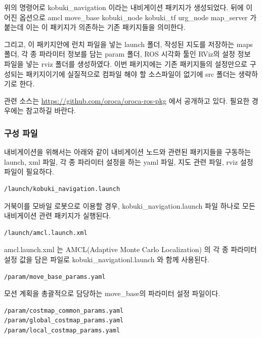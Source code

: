 위의 명령어로 kobuki\_navigation 이라는 내비게이션 패키지가 생성되었다. 뒤에 이어진 옵션으로 amcl move\_base kobuki\_node kobuki\_tf urg\_node map\_server 가 붙는데 이는 이 패키지가 의존하는 기존 패키지들을 의미한다. 

그리고, 이 패키지안에 런치 파일을 넣는 launch 폴더, 작성된 지도를 저장하는 maps폴더, 각 종 파라미터 정보를 담는 param 폴더, ROS 시각화 툴인 RViz의 설정 정보 파일을 넣는 rviz 폴더를 생성하였다. 이번 패키지에는 기존 패키지들의 설정만으로 구성되는 패키지이기에 실질적으로 컴파일 해야 할 소스파일이 없기에 src 폴더는 생략하기로 한다.

관련 소스는 \url{https://github.com/oroca/oroca-ros-pkg} 에서 공개하고 있다. 필요한 경우에는 참고하길 바란다.

\subsubsection{구성 파일}

내비게이션을 위해서는 아래와 같이 내비게이션 노드와 관련된 패키지들을 구동하는 launch, xml 파일, 각 종 파라미터 설정을 하는 yaml 파일, 지도 관련 파일, rviz 설정 파일이 필요하다.

\vspace{\baselineskip}
\begin{lstlisting}[language=ROS]
/launch/kobuki_navigation.launch
\end{lstlisting}

거북이를 모바일 로봇으로 이용할 경우, kobuki\_navigation.launch 파일 하나로 모든 내비게이션 관련 패키지가 실행된다. 

\vspace{\baselineskip}
\begin{lstlisting}[language=ROS]
/launch/amcl.launch.xml
\end{lstlisting}

amcl.launch.xml 는 AMCL(Adaptive Monte Carlo Localization) 의 각 종 파라미터 설정 값을 담은 파일로 kobuki\_navigationl.launch 와 함께 사용된다.

\vspace{\baselineskip}
\begin{lstlisting}[language=ROS]
/param/move_base_params.yaml
\end{lstlisting}

모션 계획을 총괄적으로 담당하는 move\_base의 파라미터 설정 파일이다.

\vspace{\baselineskip}
\begin{lstlisting}[language=ROS]
/param/costmap_common_params.yaml
/param/global_costmap_params.yaml
/param/local_costmap_params.yaml
\end{lstlisting}

